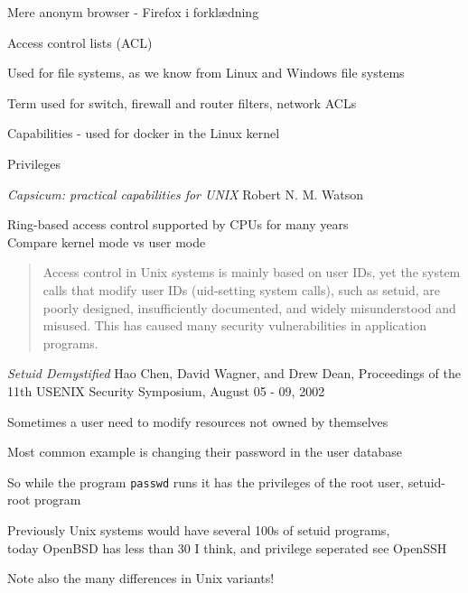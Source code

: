 \documentclass[Screen16to9,17pt]{foils}
\begin{document}





\centerline{\color{titlecolor} Mere anonym browser - Firefox i forklædning}




\begin{list1}
\item Access control lists (ACL)
\item Used for file systems, as we know from Linux and Windows file systems
\item Term used for switch, firewall and router filters, network ACLs
\item Capabilities - used for docker in the Linux kernel
\item Privileges
\item \emph{Capsicum: practical capabilities for UNIX} Robert N. M. Watson
\item Ring-based access control supported by CPUs for many years\\
Compare kernel mode vs user mode
\end{list1}





\begin{quote}
Access control in Unix systems is mainly based on user
IDs, yet the system calls that modify user IDs (uid-setting
system calls), such as setuid, are poorly designed, insufficiently documented, and widely misunderstood and
misused. This has caused many security vulnerabilities
in application programs.
\end{quote}

\emph{Setuid Demystified} Hao Chen, David Wagner, and Drew Dean,
Proceedings of the 11th USENIX Security Symposium,
August 05 - 09, 2002


\begin{list2}
\item Sometimes a user need to modify resources not owned by themselves
\item Most common example is changing their password in the user database
\item So while the program \verb+passwd+ runs it has the privileges of the root user, setuid-root program
\item Previously Unix systems would have several 100s of setuid programs, \\
today OpenBSD has less than 30 I think, and privilege seperated see OpenSSH
\item Note also the many differences in Unix variants!
\end{list2}
\end{document}
